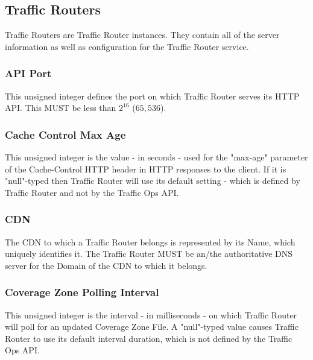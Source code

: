 %
%

\subsection{Traffic Routers}
Traffic Routers are Traffic Router instances. They contain all of the server
information as well as configuration for the Traffic Router service.

\subsubsection{API Port}
This unsigned integer defines the port on which Traffic Router serves its HTTP
API. This MUST be less than $2^{16}$ ($65,536$).

\subsubsection{Cache Control Max Age}
This unsigned integer is the value - in seconds - used for the "max-age"
parameter of the Cache-Control HTTP header in HTTP responses to the client. If
it is "null"-typed then Traffic Router will use its default setting - which is
defined by Traffic Router and not by the Traffic Ops API.

\subsubsection{CDN}
The CDN to which a Traffic Router belongs is represented by its Name, which
uniquely identifies it. The Traffic Router MUST be an/the authoritative DNS
server for the Domain of the CDN to which it belongs.

\subsubsection{Coverage Zone Polling Interval}
This unsigned integer is the interval - in milliseconds - on which Traffic
Router will poll for an updated Coverage Zone File. A "null"-typed value causes
Traffic Router to use its default interval duration, which is not defined by the
Traffic Ops API.

